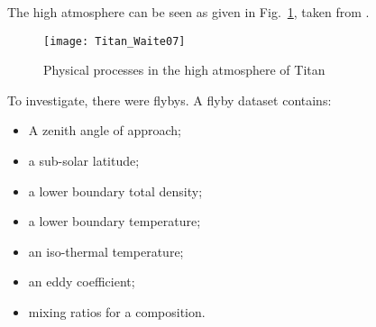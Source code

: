 The high atmosphere can be seen
as given in Fig.~\ref{Titan_high_atm}, taken
from \cite{Waite07}.

\begin{figure}
\centering
\texttt{[image: Titan\_Waite07]}
\caption{\label{Titan_high_atm}Physical processes in the high
atmosphere of Titan}
\end{figure}

To investigate, there were flybys. A flyby dataset contains:
\begin{itemize}
\item A zenith angle of approach;
\item a sub-solar latitude;
\item a lower boundary total density;
\item a lower boundary temperature;
\item an iso-thermal temperature;
\item an eddy coefficient;
\item mixing ratios for a composition.
\end{itemize}

